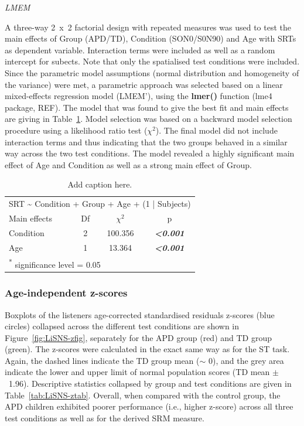\documentclass[a4paper, twoside]{templates/ociamthesis}
\begin{document}
\colorbox[HTML]{CCCCFF}{\emph{LMEM}}

A three-way 2~x~2 factorial design with repeated measures was used to test the main effects of Group (APD/TD), Condition (SON0/S0N90) and Age with SRTs as dependent variable. Interaction terms were included as well as a random intercept for subects. Note that only the spatialised test conditions were included. Since the parametric model assumptions (normal distribution and homogeneity of the variance) were met, a parametric approach was selected based on a linear mixed-effects regression model (LMEM'), using the \textbf{lmer()} function (lme4 package, REF). The model that was found to give the best fit and main effects are giving in Table~\ref{tab:LiSNS-AgeLMEM}. Model selection was based on a backward model selection procedure using a likelihood ratio test (\(\chi^{2}\)). The final model did not include interaction terms and thus indicating that the two groups behaved in a similar way across the two test conditions. The model revealed a highly significant main effect of Age and Condition as well as a strong main effect of Group.

\begin{table}

\caption{\label{tab:LiSNS-AgeLMEM}Add caption here.}
\centering
\begin{tabular}[t]{lcc>{}c}
\toprule
\multicolumn{4}{c}{SRT \textasciitilde{} Condition + Group + Age + (1 | Subjects)} \\
\cmidrule(l{3pt}r{3pt}){1-4}
Main effects & Df & $\chi^{2}$ & p\\
\midrule
Condition & 2 & 100.356 & \em{\textbf{<0.001}}\\
Age & 1 & 13.364 & \em{\textbf{<0.001}}\\
\bottomrule
\multicolumn{4}{l}{\textsuperscript{*} significance level = 0.05}\\
\end{tabular}
\end{table}

\hypertarget{age-independent-z-scores-1}{%
\subsubsection*{Age-independent z-scores}\label{age-independent-z-scores-1}}

Boxplots of the listeners age-corrected standardised residuals z-scores (blue circles) collapsed across the different test conditions are shown in Figure~\ref{fig:LiSNS-zfig}, separately for the APD group (red) and TD group (green). The z-scores were calculated in the exact same way as for the ST task. Again, the dashed lines indicate the TD group mean (\(\sim\) 0), and the grey area indicate the lower and upper limit of normal population scores (TD mean \(\pm\)~1.96). Descriptive statistics collapsed by group and test conditions are given in Table~\ref{tab:LiSNS-ztab}. Overall, when compared with the control group, the APD children exhibited poorer performance (i.e., higher z-score) across all three test conditions as well as for the derived SRM measure.
\end{document}
